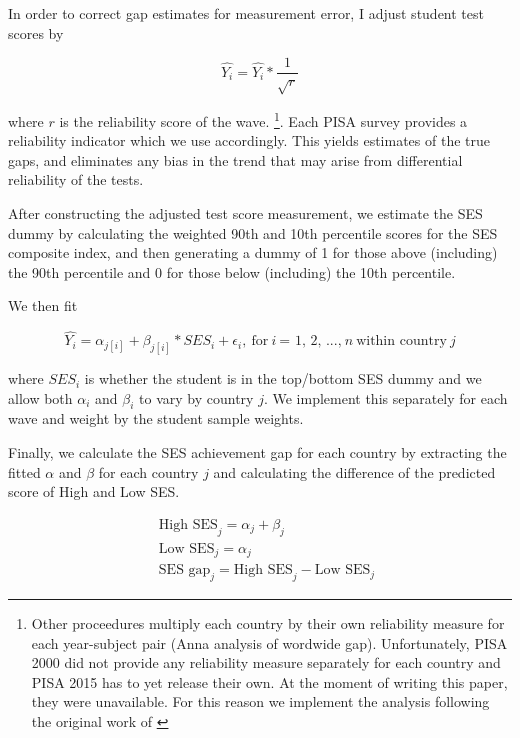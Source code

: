 \documentclass[11pt, a4paper]{article}\usepackage[]{graphicx}\usepackage[]{color}
\begin{document}
In order to correct gap estimates for measurement error, I adjust student test scores by

\begin{equation}
\hat{Y_i} = \hat{Y_i} * \frac{1}{\sqrt{r}}
\end{equation}

where \begin{math}r\end{math} is the reliability score of the wave. \footnote{Other proceedures multiply each country by their own reliability measure for each year-subject pair (Anna analysis of wordwide gap). Unfortunately, PISA 2000 did not provide any reliability measure separately for each country and PISA 2015 has to yet release their own. At the moment of writing this paper, they were unavailable. For this reason we implement the analysis following the original work of \citet{reardon2011}}. Each PISA survey provides a reliability indicator which we use accordingly. This yields estimates of the true gaps, and eliminates any bias in the trend that may arise from differential reliability of the tests.

After constructing the adjusted test score measurement, we estimate the SES dummy by calculating the weighted 90th and 10th percentile scores for the SES composite index, and then generating a dummy of 1 for those above (including) the 90th percentile and 0 for those below (including) the 10th percentile.

We then fit

\begin{equation}
\hat{Y_i} = \alpha_{j[i]} + \beta_{j[i]} * SES_i + \epsilon_i,\ \text{for} \ i \ \text{= 1, 2, ...,} \ n \ \text{within country} \ j
\end{equation}



where \(SES_i\) is whether the student is in the top/bottom SES dummy and we allow both \(\alpha_i\) and \(\beta_i\) to vary by country \(j\). We implement this separately for each wave and weight by the student sample weights.

Finally, we calculate the SES achievement gap for each country by extracting the fitted \(\alpha\) and \(\beta\) for each country \(j\) and calculating the difference of the predicted score of High and Low SES.

\begin{equation}
\begin{split}
\quad \text{High SES}_j = \alpha_j + \beta_j \\
\quad \text{Low SES}_j = \alpha_j \\
\quad \text{SES gap}_j = \text{High SES}_j - \text{Low SES}_j
\end{split}
\end{equation}
\end{document}
